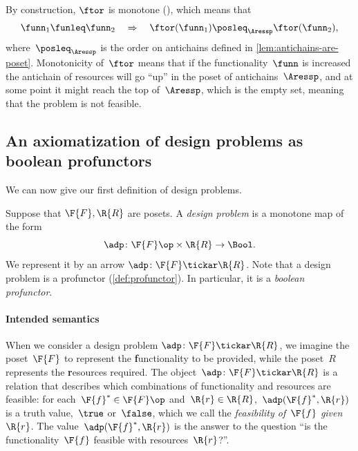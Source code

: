 By construction, $\ftor$ is monotone (), which
means that
\[
\funn_{1}\funleq\funn_{2}\quad\Rightarrow\quad\ftor(\funn_{1})\posleq_{\Aressp}\ftor(\funn_{2}),
\]
where~$\posleq_{\Aressp}$ is the order on antichains defined in
\cref{lem:antichains-are-poset}. Monotonicity of~$\ftor$ means that
if the functionality~$\funn$ is increased the antichain of resources
will go ``up'' in the poset of antichains~$\Aressp$, and at some
point it might reach the top of~$\Aressp$, which is the empty set,
meaning that the problem is not feasible.






\label{sec:dpdefinition}


\subsection{An axiomatization of design problems as boolean profunctors}
We can now give our first definition of design problems.



\begin{definition} \label{def:design-problem}
Suppose that $\F{F}, \R{R}$ are posets. A \emph{design problem} is a monotone map of the form
\begin{equation}
	\adp \colon  \F{F}\op \times \R{R} \to \Bool.
\end{equation}
We represent it by an arrow $\adp \colon \F{F} \tickar \R{R}$. Note that a design problem is a profunctor (\cref{def:profunctor}). In particular, it is a \emph{boolean profunctor}.
\end{definition}

\paragraph{Intended semantics}
When we consider a design problem $\adp\colon \F{F} \tickar \R{R}$, we imagine the poset~$\F{F}$ to represent the \textbf{f}unctionality to be provided, while the poset~$R$ represents the \textbf{r}esources required. The object~$\adp \colon \F{F} \tickar \R{R}$ is a relation that describes which combinations of functionality and resources are feasible: for each~$\F{f}^* \in \F{F}\op$ and~$\R{r} \in \R{R}$,~$\adp(\F{f}^*,\R{r})$ is a truth value,~$\true$ or~$\false$, which we call the \emph{feasibility of~$\F{f}$ given~$\R{r}$}. The value~$\adp(\F{f}^*,\R{r})$ is the answer to the question ``is the functionality~$\F{f}$ feasible with resources~$\R{r}$?''.

